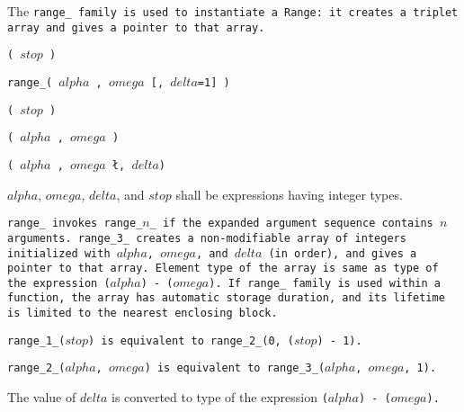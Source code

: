 The \tt{range_} family is used to instantiate a \tt{Range}:
it creates a triplet array and gives a pointer to that array.


\s\s\s\tt{(} $stop$  \tt{)}

 \tt{range_}\s\s\s\tt{(} $alpha$ \tt{,} $omega$ [\tt{,} $delta$\tt{=1}] \tt{)}

\s\tt{(} $stop$  \tt{)}

\s\tt{(} $alpha$ \tt{,} $omega$ \tt{)}

\s\tt{(} $alpha$ \tt{,} $omega$ \l\tt{,} $delta$\r \tt{)}


$alpha$, $omega$, $delta$, and $stop$ shall be expressions having integer types.


\tt{range_} invokes \tt{range_}$n$\_ if the
expanded argument sequence contains $n$ arguments.
\tt{range_3_} creates a non-modifiable array of integers initialized with
$alpha$, $omega$, and $delta$ (in order), and gives a pointer to that array.
Element type of the array is same as type of the
expression \tt{(}$alpha$\tt{) - (}$omega$\tt{)}.
If \tt{range_} family is used within a function, the array has automatic
storage duration, and its lifetime is limited to the nearest enclosing block.

\tt{range_1_(}$stop$\tt{)} is equivalent to
\tt{range_2_(0, (}$stop$\tt{) - 1)}.

\tt{range_2_(}$alpha$\tt{,} $omega$\tt{)} is equivalent to
\tt{range_3_(}$alpha$\tt{,} $omega$\tt{, 1)}.

\note The value of $delta$ is converted to type of the
expression \tt{(}$alpha$\tt{) - (}$omega$\tt{)}.
